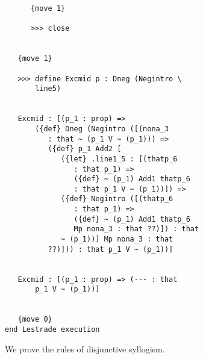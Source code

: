\documentclass[12pt]{article}
\begin{document}
\begin{verbatim}
      {move 1}

      >>> close


   {move 1}

   >>> define Excmid p : Dneg (Negintro \
       line5)


   Excmid : [(p_1 : prop) => 
       ({def} Dneg (Negintro ([(nona_3 
          : that ~ (p_1 V ~ (p_1))) => 
          ({def} p_1 Add2 [
             ({let} .line1_5 : [(thatp_6 
                : that p_1) => 
                ({def} ~ (p_1) Add1 thatp_6 
                : that p_1 V ~ (p_1))]) => 
             ({def} Negintro ([(thatp_6 
                : that p_1) => 
                ({def} ~ (p_1) Add1 thatp_6 
                Mp nona_3 : that ??)]) : that 
             ~ (p_1))] Mp nona_3 : that 
          ??)])) : that p_1 V ~ (p_1))]


   Excmid : [(p_1 : prop) => (--- : that 
       p_1 V ~ (p_1))]


   {move 0}
end Lestrade execution
\end{verbatim}

We prove the rules of disjunctive syllogism.
\end{document}
